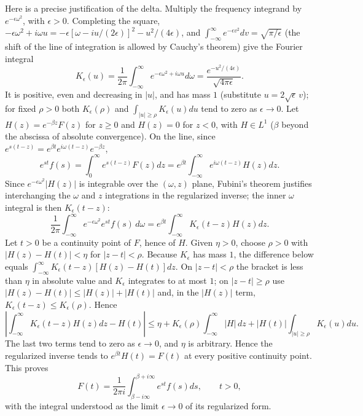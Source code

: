 Here is a precise justification of the delta. Multiply the
frequency integrand by $e^{-\epsilon\omega^2}$, with
$\epsilon>0$. Completing the square,
$-\epsilon\omega^2+i\omega u
=-\epsilon[\omega-iu/(2\epsilon)]^2-u^2/(4\epsilon)$, and
$\int_{-\infty}^\infty e^{-\epsilon v^2}dv=\sqrt{\pi/\epsilon}$
(the shift of the line of integration is allowed by
Cauchy's theorem) give the Fourier integral
\[
K_\epsilon(u)=\frac1{2\pi}\int_{-\infty}^{\infty}
e^{-\epsilon\omega^2+i\omega u}d\omega
=\frac{e^{-u^2/(4\epsilon)}}{\sqrt{4\pi\epsilon}}.
\]
It is positive, even and decreasing in $|u|$, and has mass $1$
(substitute $u=2\sqrt\epsilon\,v$); for fixed $\rho>0$ both
$K_\epsilon(\rho)$ and $\int_{|u|\ge\rho}K_\epsilon(u)du$
tend to zero as $\epsilon\to0$. Let
$H(z)=e^{-\beta z}F(z)$ for $z\ge0$ and $H(z)=0$ for $z<0$,
with $H\in L^1$ ($\beta$ beyond the abscissa of absolute
convergence). On the line, since
$e^{s(t-z)}=e^{\beta t}e^{i\omega(t-z)}e^{-\beta z}$,
\[
e^{st}f(s)=\int_0^\infty e^{s(t-z)}F(z)dz
=e^{\beta t}\int_{-\infty}^{\infty}e^{i\omega(t-z)}H(z)dz.
\]
Since $e^{-\epsilon\omega^2}|H(z)|$ is integrable over the
$(\omega,z)$ plane, Fubini's theorem justifies interchanging
the $\omega$ and $z$ integrations in the regularized inverse;
the inner $\omega$ integral is then $K_\epsilon(t-z)$:
\[
\frac1{2\pi}\int_{-\infty}^{\infty}e^{-\epsilon\omega^2}
e^{st}f(s)\,d\omega
=e^{\beta t}\int_{-\infty}^{\infty}K_\epsilon(t-z)H(z)dz.
\]
Let $t>0$ be a continuity point of $F$, hence of $H$. Given
$\eta>0$, choose $\rho>0$ with $|H(z)-H(t)|<\eta$ for
$|z-t|<\rho$. Because $K_\epsilon$ has mass $1$, the
difference below equals
$\int_{-\infty}^{\infty}K_\epsilon(t-z)[H(z)-H(t)]dz$. On
$|z-t|<\rho$ the bracket is less than $\eta$ in absolute value
and $K_\epsilon$ integrates to at most $1$; on $|z-t|\ge\rho$
use $|H(z)-H(t)|\le|H(z)|+|H(t)|$ and, in the $|H(z)|$ term,
$K_\epsilon(t-z)\le K_\epsilon(\rho)$. Hence
\[
\left|\int_{-\infty}^{\infty}K_\epsilon(t-z)H(z)dz-H(t)\right|
\le\eta+K_\epsilon(\rho)\int_{-\infty}^\infty|H|\,dz
+|H(t)|\int_{|u|\ge\rho}K_\epsilon(u)du.
\]
The last two terms tend to zero as $\epsilon\to0$, and $\eta$
is arbitrary. Hence the regularized inverse tends to
$e^{\beta t}H(t)=F(t)$ at every positive continuity
point. This proves
\[
\boxed{F(t)=\frac1{2\pi i}\int_{\beta-i\infty}^{\beta+i\infty}
e^{st}f(s)ds},\qquad t>0,
\]
with the integral understood as the limit $\epsilon\to0$ of
its regularized form.

